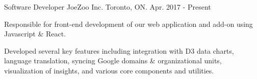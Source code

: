 

\begin{cventries}

  \cventry
    {Software Developer} %
    {JoeZoo Inc.} %
    {Toronto, ON.} %
    {Apr. 2017 - Present} %
    {
      \begin{cvitems} %
        \item {Responsible for front-end development of our web application and add-on using Javascript \& React.}
        \item {Developed several key features including integration with D3 data charts, language translation, syncing Google domains \& organizational units, visualization of insights, and various core components and utilities.}
      \end{cvitems}
    }

\end{cventries}
